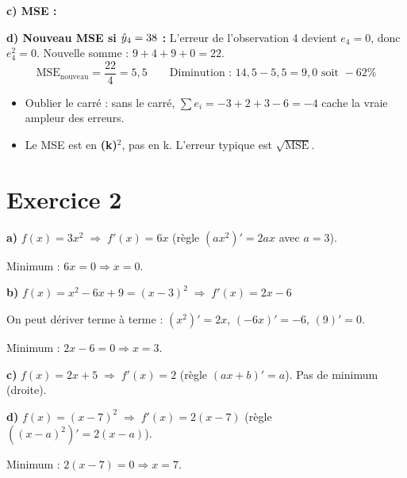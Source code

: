 \textbf{c) MSE :}

\textbf{d) Nouveau MSE si $\hat{y}_4 = 38$ :}
L'erreur de l'observation 4 devient $e_4 = 0$, donc $e_4^2 = 0$.
Nouvelle somme : $9 + 4 + 9 + 0 = 22$.
\[
    \text{MSE}_{\text{nouveau}} = \frac{22}{4} = \boxed{5{,}5}
    \qquad \text{Diminution : } 14{,}5 - 5{,}5 = 9{,}0 \text{ soit } -62\%
\]

\begin{attentionbox}
    \begin{itemize}
        \item Oublier le carr\'{e} : sans le carr\'{e}, $\sum e_i = -3+2+3-6 = -4$ cache la vraie ampleur des erreurs.
        \item Le MSE est en \textbf{(k\texteuro)$^2$}, pas en k\texteuro. L'erreur typique est $\sqrt{\text{MSE}}$.
    \end{itemize}
\end{attentionbox}

\section*{Exercice 2 \hfill \exofondamental}

\separateur

\textbf{a)} $f(x) = 3x^2 \;\Longrightarrow\; f'(x) = \boxed{6x}$
\quad (r\`{e}gle $(ax^2)' = 2ax$ avec $a = 3$).

Minimum : $6x = 0 \Rightarrow \boxed{x = 0}$.

\medskip
\textbf{b)} $f(x) = x^2 - 6x + 9 = (x - 3)^2 \;\Longrightarrow\; f'(x) = \boxed{2x - 6}$

On peut d\'{e}river terme \`{a} terme : $(x^2)' = 2x$, $(-6x)' = -6$, $(9)' = 0$.

Minimum : $2x - 6 = 0 \Rightarrow \boxed{x = 3}$.

\medskip
\textbf{c)} $f(x) = 2x + 5 \;\Longrightarrow\; f'(x) = \boxed{2}$
\quad (r\`{e}gle $(ax+b)' = a$). Pas de minimum (droite).

\medskip
\textbf{d)} $f(x) = (x - 7)^2 \;\Longrightarrow\; f'(x) = \boxed{2(x - 7)}$
\quad (r\`{e}gle $((x{-}a)^2)' = 2(x{-}a)$).

Minimum : $2(x-7) = 0 \Rightarrow \boxed{x = 7}$.


